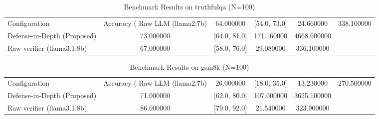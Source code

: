 \begin{table}
\caption{Benchmark Results on truthfulqa (N=100)}
\label{tab:truthfulqa_benchmark}
\begin{tabular}{lcccc}
\toprule
Configuration & Accuracy (%
\midrule
Raw LLM (llama2:7b) & 64.000000 & [54.0, 73.0] & 24.660000 & 338.100000 \\
Defense-in-Depth (Proposed) & 73.000000 & [64.0, 81.0] & 171.160000 & 4668.600000 \\
Raw verifier (llama3.1:8b) & 67.000000 & [58.0, 76.0] & 29.080000 & 336.100000 \\
\bottomrule
\end{tabular}
\end{table}

\begin{table}
\caption{Benchmark Results on gsm8k (N=100)}
\label{tab:gsm8k_benchmark}
\begin{tabular}{lcccc}
\toprule
Configuration & Accuracy (%
\midrule
Raw LLM (llama2:7b) & 26.000000 & [18.0, 35.0] & 13.230000 & 270.500000 \\
Defense-in-Depth (Proposed) & 71.000000 & [62.0, 80.0] & 107.000000 & 3625.100000 \\
Raw verifier (llama3.1:8b) & 86.000000 & [79.0, 92.0] & 21.540000 & 323.900000 \\
\bottomrule
\end{tabular}
\end{table}
